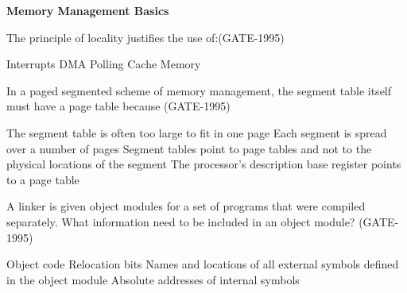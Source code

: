 \centerline{\textbf{ \LARGE Memory Management Basics}}





\begin{questyle}

  \question  The principle of locality justifies the use of:(GATE-1995)

  \begin{oneparchoices}
    \choice Interrupts
    \choice DMA
    \choice Polling
    \choice Cache Memory
  \end{oneparchoices}
\end{questyle}


\begin{questyle}

  \question  In a paged segmented scheme of memory management, the segment table itself must have
             a page table because (GATE-1995)

  \begin{choices}
    \choice The segment table is often too large to fit in one page
    \choice Each segment is spread over a number of pages
    \choice Segment tables point to page tables and not to the physical locations of the segment
    \choice The processor’s description base register points to a page table
  \end{choices}
\end{questyle}


\begin{questyle}

  \question  A linker is given object modules for a set of programs that were compiled separately. What information need to be included in an object module? (GATE-1995)

  \begin{choices}
    \choice Object code
    \choice Relocation bits
    \choice Names and locations of all external symbols defined in the object module
    \choice Absolute addresses of internal symbols
  \end{choices}
\end{questyle}


